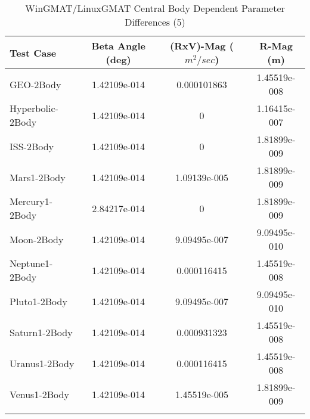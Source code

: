 \begin{table}[htbp!]
\centering
\caption{ WinGMAT/LinuxGMAT Central Body Dependent Parameter Differences (5)}
      \begin{tabular}{lccc}
      \hline\hline
          Test Case & Beta Angle (deg) & (RxV)-Mag ($m^2/sec$) & R-Mag (m) \\
         \hline
         GEO-2Body & 1.42109e-014 & 0.000101863 & 1.45519e-008 \\
         Hyperbolic-2Body & 1.42109e-014 & 0 & 1.16415e-007 \\
         ISS-2Body & 1.42109e-014 & 0 & 1.81899e-009 \\
         Mars1-2Body & 1.42109e-014 & 1.09139e-005 & 1.81899e-009 \\
         Mercury1-2Body & 2.84217e-014 & 0 & 1.81899e-009 \\
         Moon-2Body & 1.42109e-014 & 9.09495e-007 & 9.09495e-010 \\
         Neptune1-2Body & 1.42109e-014 & 0.000116415 & 1.45519e-008 \\
         Pluto1-2Body & 1.42109e-014 & 9.09495e-007 & 9.09495e-010 \\
         Saturn1-2Body & 1.42109e-014 & 0.000931323 & 1.45519e-008 \\
         Uranus1-2Body & 1.42109e-014 & 0.000116415 & 1.45519e-008 \\
         Venus1-2Body & 1.42109e-014 & 1.45519e-005 & 1.81899e-009 \\
      \hline\hline
      \label{Table: WinGMAT-LinuxGMAT CB Parameters Set 5} 
\end{tabular}
\end{table}
